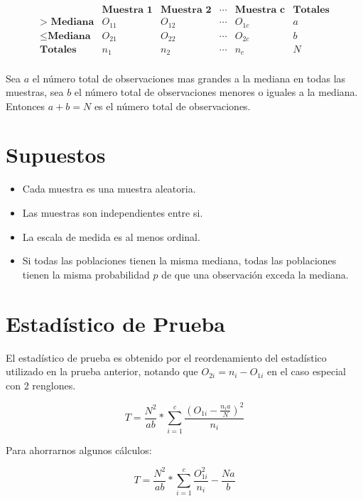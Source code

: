 \documentclass[
  a4paper,
  oneside,
  openany]{book}
\begin{document}
\[
\begin{array}{c|c|c|c|c|c}
 & \textbf{Muestra 1}  & \textbf{Muestra 2}    & \cdots & \textbf{Muestra c} &\textbf{Totales}     \\
\hline
\textbf{> Mediana} & O_{11} & O_{12} & \cdots & O_{1c} & a   \\
\hline
\leq \textbf{Mediana} & O_{21} & O_{22} & \cdots & O_{2c} & b\\
\hline
\textbf{Totales}    & n_{1}  & n_{2}  & \cdots & n_{c}  & N \\
\end{array}
\]

Sea \(a\) el número total de observaciones mas grandes a la mediana en todas las muestras, sea \(b\) el número total de observaciones menores o iguales a la mediana. Entonces \(a+b=N\) es el número total de observaciones.

\hypertarget{supuestos-12}{%
\section{Supuestos}\label{supuestos-12}}

\begin{itemize}
\item
  Cada muestra es una muestra aleatoria.
\item
  Las muestras son independientes entre si.
\item
  La escala de medida es al menos ordinal.
\item
  Si todas las poblaciones tienen la misma mediana, todas las poblaciones tienen la misma probabilidad \(p\) de que una observación exceda la mediana.
\end{itemize}

\hypertarget{estaduxedstico-de-prueba-12}{%
\section{Estadístico de Prueba}\label{estaduxedstico-de-prueba-12}}

El estadístico de prueba es obtenido por el reordenamiento del estadístico utilizado en la prueba anterior, notando que \(O_{2i}=n_{i}-O_{1i}\) en el caso especial con 2 renglones.

\[T=\frac{N^2}{ab}*\sum^{c}_{i=1}\frac{(O_{1i}-\frac{n_{i}a}{N})^2}{n_i}\]

Para ahorrarnos algunos cálculos:

\[T=\frac{N^2}{ab}*\sum^{c}_{i=1}\frac{O_{1i}^2}{n_i}-\frac{Na}{b}\]
\end{document}
